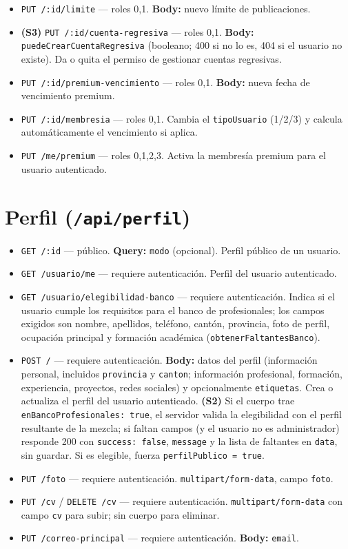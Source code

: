\begin{itemize}
    \item \texttt{PUT /:id/limite} — roles 0,1. \textbf{Body:} nuevo límite de publicaciones.
    \item \textbf{(S3)} \texttt{PUT /:id/cuenta-regresiva} — roles 0,1. \textbf{Body:} \texttt{puedeCrearCuentaRegresiva} (booleano; 400 si no lo es, 404 si el usuario no existe). Da o quita el permiso de gestionar cuentas regresivas.
    \item \texttt{PUT /:id/premium-vencimiento} — roles 0,1. \textbf{Body:} nueva fecha de vencimiento premium.
    \item \texttt{PUT /:id/membresia} — roles 0,1. Cambia el \texttt{tipoUsuario} (1/2/3) y calcula automáticamente el vencimiento si aplica.
    \item \texttt{PUT /me/premium} — roles 0,1,2,3. Activa la membresía premium para el usuario autenticado.
\end{itemize}

\section{Perfil (\texttt{/api/perfil})}
\begin{itemize}
    \item \texttt{GET /:id} — público. \textbf{Query:} \texttt{modo} (opcional). Perfil público de un usuario.
    \item \texttt{GET /usuario/me} — requiere autenticación. Perfil del usuario autenticado.
    \item \texttt{GET /usuario/elegibilidad-banco} — requiere autenticación. Indica si el usuario cumple los requisitos para el banco de profesionales; los campos exigidos son nombre, apellidos, teléfono, cantón, provincia, foto de perfil, ocupación principal y formación académica (\texttt{obtenerFaltantesBanco}).
    \item \texttt{POST /} — requiere autenticación. \textbf{Body:} datos del perfil (información personal, incluidos \texttt{provincia} y \texttt{canton}; información profesional, formación, experiencia, proyectos, redes sociales) y opcionalmente \texttt{etiquetas}. Crea o actualiza el perfil del usuario autenticado. \textbf{(S2)} Si el cuerpo trae \texttt{enBancoProfesionales: true}, el servidor valida la elegibilidad con el perfil resultante de la mezcla; si faltan campos (y el usuario no es administrador) responde 200 con \texttt{success: false}, \texttt{message} y la lista de faltantes en \texttt{data}, sin guardar. Si es elegible, fuerza \texttt{perfilPublico = true}.
    \item \texttt{PUT /foto} — requiere autenticación. \texttt{multipart/form-data}, campo \texttt{foto}.
    \item \texttt{PUT /cv} / \texttt{DELETE /cv} — requiere autenticación. \texttt{multipart/form-data} con campo \texttt{cv} para subir; sin cuerpo para eliminar.
    \item \texttt{PUT /correo-principal} — requiere autenticación. \textbf{Body:} \texttt{email}.
\end{itemize}

